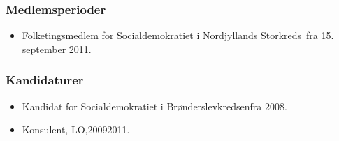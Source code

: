 \documentclass[11pt, a4paper]{awesome-cv}
\begin{document}
\begin{cvletter}
\subsubsection*{Medlemsperioder}
\begin{itemize}
\item Folketingsmedlem for Socialdemokratiet i Nordjyllands Storkreds fra 15. september 2011.
\end{itemize}
\subsubsection*{Kandidaturer}
\begin{itemize}
\item Kandidat for Socialdemokratiet i Brønderslevkredsenfra 2008.
\end{itemize}
\begin{itemize}
\item Konsulent, LO,20092011.
\end{itemize}
\end{cvletter}
\end{document}
